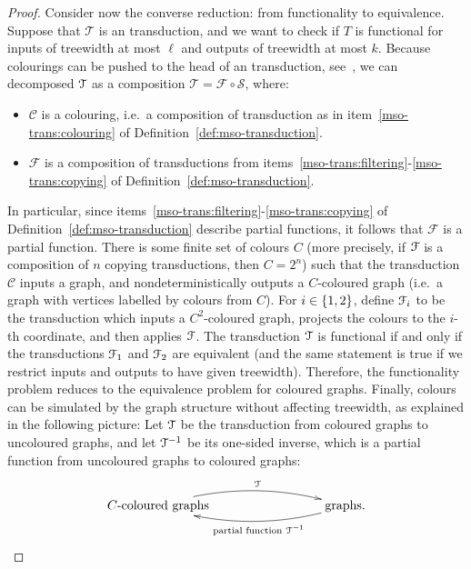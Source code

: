 \begin{proof}
    Consider now the converse reduction: from functionality to equivalence. Suppose that $\mathcal T$ is an \mso transduction, and we want to check if $T$ is functional for inputs of treewidth at most $\ell$ and outputs of treewidth at most $k$. Because colourings can be pushed to the head of an \mso transduction, see~\cite[Section 1.7]{courcelleGraphStructureMonadic2012}, we can decomposed ${\mathcal T}$ as a  composition $\mathcal T =  \mathcal F \circ \mathcal S$, where:
    \begin{itemize}
        \item $\mathcal C$ is a colouring, i.e.~a composition of transduction as in item~\ref{mso-trans:colouring} of Definition~\ref{def:mso-transduction}.
        \item $\mathcal F$ is a composition of transductions from items~\ref{mso-trans:filtering}-\ref{mso-trans:copying} of Definition~\ref{def:mso-transduction}.
    \end{itemize}
    In particular, since items~\ref{mso-trans:filtering}-\ref{mso-trans:copying} of Definition~\ref{def:mso-transduction} describe partial functions, it follows that $\mathcal F$ is a partial function. There is some finite set of colours $C$ (more precisely, if ${\mathcal F}$ is a composition of $n$ copying transductions, then $C=2^n$) such that the  transduction $\mathcal C$ inputs a graph, and nondeterministically outputs a $C$-coloured graph (i.e.~a graph with vertices labelled by colours from $C$). For $i  \in \{1,2\}$, define ${\mathcal F}_i$ to be the \mso transduction which inputs a $C^2$-coloured  graph, projects the colours to the $i$-th coordinate, and then applies ${\mathcal F}$. The transduction ${\mathcal T}$ is functional if and only if the transductions ${\mathcal F}_1$ and ${\mathcal F}_2$ are equivalent (and the same statement is true if we restrict inputs and outputs to have given treewidth). Therefore, the functionality problem reduces to the equivalence problem for coloured graphs. Finally, colours can be simulated by the graph structure without affecting treewidth,  as explained in the following picture:
    Let ${\mathcal T}$ be the \mso transduction from coloured graphs to uncoloured graphs, and let ${\mathcal T}^{-1}$ be its one-sided inverse, which is a partial function from uncoloured graphs to coloured graphs:
    \begin{align*}
        \xymatrix@C=3cm{
            \text{$C$-coloured graphs}
            \ar@/^1pc/[r]^-{\Tt} &
            \text{graphs}.
            \ar@/^1pc/[l]^-{\text{partial function }\Tt^{-1}}
        }
        \end{align*}

\end{proof}
